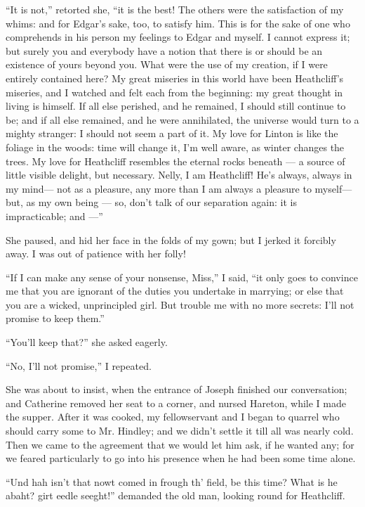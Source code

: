 \par “It is not,” retorted she, “it is the best! The others were the satisfaction of my whims: and for Edgar's sake, too, to satisfy him. This is for the sake of one who comprehends in his person my feelings to Edgar and myself. I cannot express it; but surely you and everybody have a notion that there is or should be an existence of yours beyond you. What were the use of my creation, if I were entirely contained here? My great miseries in this world have been Heathcliff's miseries, and I watched and felt each from the beginning: my great thought in living is himself. If all else perished, and he remained, I should still continue to be; and if all else remained, and he were annihilated, the universe would turn to a mighty stranger: I should not seem a part of it. My love for Linton is like the foliage in the woods: time will change it, I'm well aware, as winter changes the trees. My love for Heathcliff resembles the eternal rocks beneath — a source of little visible delight, but necessary. Nelly, I am Heathcliff! He's always, always in my mind— not as a pleasure, any more than I am always a pleasure to myself— but, as my own being — so, don't talk of our separation again: it is impracticable; and —”
\par She paused, and hid her face in the folds of my gown; but I jerked it forcibly away. I was out of patience with her folly!
\par “If I can make any sense of your nonsense, Miss,” I said, “it only goes to convince me that you are ignorant of the duties you undertake in marrying; or else that you are a wicked, unprincipled girl. But trouble me with no more secrets: I'll not promise to keep them.”
\par “You'll keep that?” she asked eagerly.
\par “No, I'll not promise,” I repeated.
\par She was about to insist, when the entrance of Joseph finished our conversation; and Catherine removed her seat to a corner, and nursed Hareton, while I made the supper. After it was cooked, my fellowservant and I began to quarrel who should carry some to Mr. Hindley; and we didn't settle it till all was nearly cold. Then we came to the agreement that we would let him ask, if he wanted any; for we feared particularly to go into his presence when he had been some time alone.
\par “Und hah isn't that nowt comed in frough th' field, be this time? What is he abaht? girt eedle seeght!” demanded the old man, looking round for Heathcliff.
